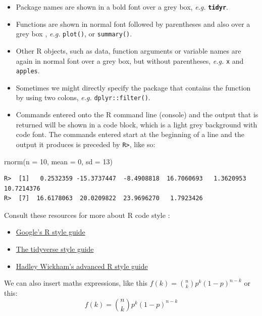 \documentclass[
]{book}
\newenvironment{Shaded}{\begin{snugshade}}{\end{snugshade}}
\newcommand{\AttributeTok}[1]{\textcolor[rgb]{0.77,0.63,0.00}{#1}}
\newcommand{\DecValTok}[1]{\textcolor[rgb]{0.00,0.00,0.81}{#1}}
\newcommand{\FunctionTok}[1]{\textcolor[rgb]{0.00,0.00,0.00}{#1}}
\newcommand{\NormalTok}[1]{#1}
\providecommand{\tightlist}{%
  \setlength{\itemsep}{0pt}\setlength{\parskip}{0pt}}
\begin{document}
\begin{itemize}
\tightlist
\item
  Package names are shown in a bold font over a grey box, \emph{e.g.} \textbf{\texttt{tidyr}}.
\item
  Functions are shown in normal font followed by parentheses and also over a grey box , \emph{e.g.} \texttt{plot()}, or \texttt{summary()}.
\item
  Other R objects, such as data, function arguments or variable names are again in normal font over a grey box, but without parentheses, \emph{e.g.} \texttt{x} and \texttt{apples}.
\item
  Sometimes we might directly specify the package that contains the function by using two colons, \emph{e.g.} \texttt{dplyr::filter()}.
\item
  Commands entered onto the R command line (console) and the output that is returned will be shown in a code block, which is a light grey background with code font. The commands entered start at the beginning of a line and the output it produces is preceded by \texttt{R\textgreater{}}, like so:
\end{itemize}

\begin{Shaded}
\begin{Highlighting}[]
\FunctionTok{rnorm}\NormalTok{(}\AttributeTok{n =} \DecValTok{10}\NormalTok{, }\AttributeTok{mean =} \DecValTok{0}\NormalTok{, }\AttributeTok{sd =} \DecValTok{13}\NormalTok{)}
\end{Highlighting}
\end{Shaded}

\begin{verbatim}
R>  [1]   0.2532359 -15.3737447  -8.4908818  16.7060693   1.3620953  10.7214376
R>  [7]  16.6178063  20.0209822  23.9696270   1.7923426
\end{verbatim}

Consult these resources for more about R code style :

\begin{itemize}
\tightlist
\item
  \href{https://google.github.io/styleguide/Rguide.xml}{Google's R style guide}
\item
  \href{http://style.tidyverse.org}{The tidyverse style guide}
\item
  \href{http://adv-r.had.co.nz/Style.html}{Hadley Wickham's advanced R style guide}
\end{itemize}

We can also insert maths expressions, like this \(f(k) = {n \choose k} p^{k} (1-p)^{n-k}\) or this: \[f(k) = {n \choose k} p^{k} (1-p)^{n-k}\]
\end{document}
